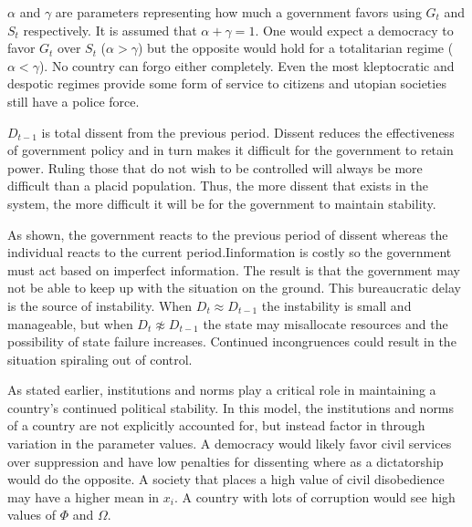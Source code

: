 \documentclass[12pt]{article}
\begin{document}
\begin{spacing}{1.5}
$\alpha$ and $\gamma $ are parameters representing how much a government favors using $G_t$ and $S_t$ respectively. It is assumed that $\alpha+\gamma=1$. One would expect a democracy to favor $G_t$ over $S_t$ ($\alpha > \gamma$) but the opposite would hold for a totalitarian regime ($\alpha < \gamma $). No country can forgo either completely. Even the most kleptocratic and despotic regimes provide some form of service to citizens and utopian societies still have a police force.

$D_{t-1}$ is total dissent from the previous period. Dissent reduces the effectiveness of government policy and in turn makes it difficult for the government to retain power. Ruling those that do not wish to be controlled will always be more difficult than a placid population. Thus, the more dissent that exists in the system, the more difficult it will be for the government to maintain stability.  

As shown, the government reacts to the previous period of dissent whereas the individual reacts to the current period.Iinformation is costly so the government must act based on imperfect information. The result is that the government may not be able to keep up with the situation on the ground. This bureaucratic delay is the source of instability. When $D_t \approx D_{t-1}$ the instability is small and manageable, but when $D_t \not\approx D_{t-1}$ the state may misallocate resources and the possibility of state failure increases. Continued incongruences could result in the situation spiraling out of control. 


As stated earlier, institutions and norms play a critical role in maintaining a country's continued political stability. In this model, the institutions and norms of a country are not explicitly accounted for, but instead factor in through variation in the parameter values. A democracy would likely favor civil services over suppression and have low penalties for dissenting where as a dictatorship would do the opposite. A society that places a high value of civil disobedience may have a higher mean in $x_i$. A country with lots of corruption would see high values of $\Phi$ and $\Omega$.   


\end{spacing}
\end{document}

